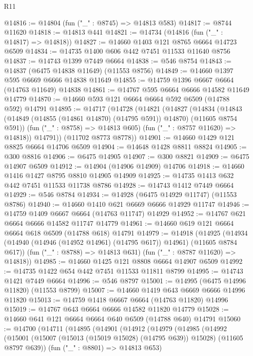 \begin{lexlean}{R11}
\begin{coremodule}
@14816 := @14804 (fun ("_" : @8745) => @14813 @583)
@14817 := @8744 @11620
@14818 := @14813 @441
@14821 := @14734 (@14816 (fun ("_" : @14817) => @14818))
@14827 := @14660 @1403 @121 @8765 @6664 @14723 @6509
@14834 := @14735 @1400 @606 @442 @7451 @11533 @11640 @8756
@14837 := @14743 @1399 @7449 @6664
@14838 := @546 @8754
@14843 := @14837 (@6475 @14838 @11649) (@11553 @8756)
@14849 := @14660 @1397 @595 @6669 @6666 @14838 @11649
@14855 := @14759 @1396 @6667 @6664 (@14763 @11649) @14838
@14861 := @14767 @595 @6664 @6666 @14582 @11649 @14779
@14870 := @14660 @593 @121 @6664 @6664 @592 @6509 (@14788 @592) @14791
@14895 := @14717
    (@14728
      (@14821
        (@14827
          (@14834
            (@14843 (@14849 (@14855 (@14861 @14870) (@14795 @591)) @14870) (@11605 @8754 @591))
            (fun ("_" : @8758) => @14813 @605)
            (fun ("_" : @8757 @11620) => @14818))
          @14791))
      (@11702 @8773 @8778))
@14901 := @14660 @1429 @121 @8825 @6664 @14706 @6509
@14904 := @14648 @1428 @8811 @8824
@14905 := @300 @8816
@14906 := @6475 @14905
@14907 := @300 @8821
@14909 := @6475 @14907 @6509
@14912 := @14904 (@14906 @14909) @14706
@14918 := @14660 @1416 @1427 @8795 @8810 @14905 @14909
@14925 := @14735 @1413 @632 @442 @7451 @11533 @11738 @8786
@14928 := @14743 @1412 @7449 @6664
@14929 := @546 @8784
@14934 := @14928 (@6475 @14929 @11747) (@11553 @8786)
@14940 := @14660 @1410 @621 @6669 @6666 @14929 @11747
@14946 := @14759 @1409 @6667 @6664 (@14763 @11747) @14929
@14952 := @14767 @621 @6664 @6666 @14582 @11747 @14779
@14961 := @14660 @619 @121 @6664 @6664 @618 @6509 (@14788 @618) @14791
@14979 := @14918
    (@14925
      (@14934 (@14940 (@14946 (@14952 @14961) (@14795 @617)) @14961) (@11605 @8784 @617))
      (fun ("_" : @8788) => @14813 @631)
      (fun ("_" : @8787 @11620) => @14818))
@14985 := @14660 @1425 @121 @8808 @6664 @14907 @6509
@14992 := @14735 @1422 @654 @442 @7451 @11533 @11811 @8799
@14995 := @14743 @1421 @7449 @6664
@14996 := @546 @8797
@15001 := @14995 (@6475 @14996 @11820) (@11553 @8799)
@15007 := @14660 @1419 @643 @6669 @6666 @14996 @11820
@15013 := @14759 @1418 @6667 @6664 (@14763 @11820) @14996
@15019 := @14767 @643 @6664 @6666 @14582 @11820 @14779
@15028 := @14660 @641 @121 @6664 @6664 @640 @6509 (@14788 @640) @14791
@15060 := @14700
    (@14711
      (@14895
        (@14901
          (@14912
            (@14979
              (@14985
                (@14992
                  (@15001
                    (@15007 (@15013 (@15019 @15028) (@14795 @639)) @15028)
                    (@11605 @8797 @639))
                  (fun ("_" : @8801) => @14813 @653)

\end{coremodule}
\end{lexlean}
